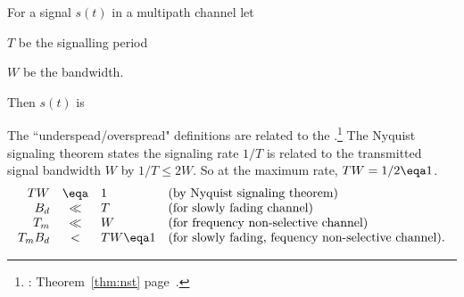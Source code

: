 \begin{definition}
For a signal $s(t)$ in a multipath channel let
\begin{liste}
   \item $T$ be the signalling period
   \item $W$ be the bandwidth.
\end{liste}

Then $s(t)$ is 

\end{definition}

The ``underspead/overspread" definitions are related to the 
.\footnote{
  : 
  Theorem~\ref{thm:nst} page~\pageref{thm:nst}.
  }
The Nyquist signaling theorem states
the signaling rate $1/T$ is related to 
the transmitted signal bandwidth $W$ by $1/T \le 2W$.
So at the maximum rate, $TW=1/2\eqa 1$.
\[\begin{array}{rcll}
  TW     &\eqa& 1           & \mbox{(by Nyquist signaling theorem)                      } \\
  B_d    &\ll&  T           & \mbox{(for slowly fading channel)                         } \\
  T_m    &\ll&  W           & \mbox{(for frequency non-selective channel)               } \\
  T_mB_d &<&    TW \eqa 1   & \mbox{(for slowly fading, fequency non-selective channel).}
\end{array}\]


